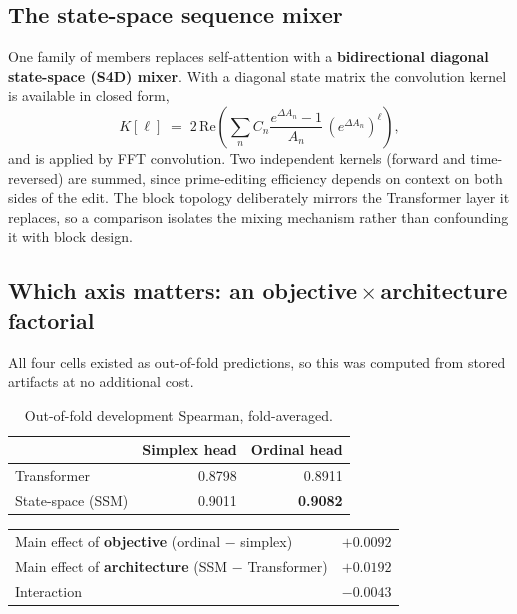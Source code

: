 \documentclass[11pt]{article}
\begin{document}
\subsection{The state-space sequence mixer}

One family of members replaces self-attention with a \textbf{bidirectional diagonal
state-space (S4D) mixer}. With a diagonal state matrix the convolution kernel is
available in closed form,
\[
K[\ell] \;=\; 2\,\mathrm{Re}\!\left(\textstyle\sum_n C_n \frac{e^{\Delta A_n}-1}{A_n}\,
\left(e^{\Delta A_n}\right)^{\ell}\right),
\]
and is applied by FFT convolution. Two independent kernels (forward and time-reversed)
are summed, since prime-editing efficiency depends on context on both sides of the
edit. The block topology deliberately mirrors the Transformer layer it replaces, so a
comparison isolates the mixing mechanism rather than confounding it with block design.

\subsection{Which axis matters: an objective\,$\times$\,architecture factorial}

All four cells existed as out-of-fold predictions, so this was computed from stored
artifacts at no additional cost.

\begin{table}[H]
\centering
\caption{Out-of-fold development Spearman, fold-averaged.}
\label{tab:factorial}
\begin{tabular}{lrr}
\toprule
 & Simplex head & Ordinal head \\
\midrule
Transformer & 0.8798 & 0.8911 \\
State-space (SSM) & 0.9011 & \textbf{0.9082} \\
\bottomrule
\end{tabular}
\end{table}

\begin{center}
\begin{tabular}{lr}
\toprule
Main effect of \textbf{objective} (ordinal $-$ simplex) & $+0.0092$ \\
Main effect of \textbf{architecture} (SSM $-$ Transformer) & $\mathbf{+0.0192}$ \\
Interaction & $-0.0043$ \\
\bottomrule
\end{tabular}
\end{center}
\end{document}
